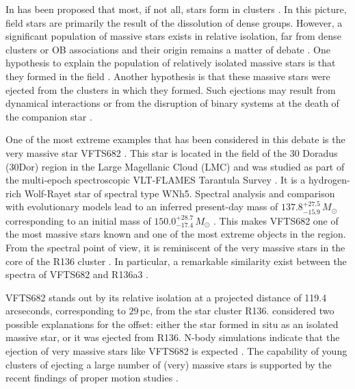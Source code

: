 \documentclass[a4paper,fleqn,usenatbib]{mnras}
\newcommand{\Msun}{{\,\mathrm{M}_\odot}}
\begin{document}
In has been proposed that most, if not all, stars form in clusters
\citep[and references therein]{lada:03}. In this picture, field stars are primarily the result
of the dissolution of dense groups.  However, a significant population
of massive stars exists in relative isolation, far from dense clusters
or OB associations and their origin remains a matter of debate
\citep{gvaramadze:12, lamb:16,ward:18}. One hypothesis to explain
the population of relatively isolated massive stars is that they
formed in the field \citep[e.g.,][]{parker:07}. Another
hypothesis is that these massive stars were ejected from the clusters
in which they formed. Such ejections may result from dynamical interactions \citep[e.g.,][]{poveda:67} or from the disruption of binary systems at the death of the companion  star \citep[e.g.,][]{blaauw:61, renzo:18}. 
 

One of the most extreme examples that has been considered in this
debate is the very massive star VFTS682  \citep[][]{bestenlehner:11,
  bressert:12}. This star is located in the field of the 30 Doradus
(30Dor) region in the Large Magellanic Cloud (LMC) and was studied as part of the multi-epoch spectroscopic VLT-FLAMES Tarantula Survey \citep[VFTS,][]{evans:11}. It is a hydrogen-rich Wolf-Rayet star of spectral type WNh5. Spectral analysis and comparison with evolutionary models lead to an inferred present-day mass of $137.8^{+27.5}_{-15.9}\,M_\odot$ corresponding to an initial mass of $150.0^{+28.7}_{-17.4}\,M_\odot$
\citep{schneider:18}. 
This makes VFTS682 one of the most massive stars known and one of the most extreme objects in the region.
From the spectral point of view, it is reminiscent of the very
massive stars in the core of the R136 cluster \citep{dekoter:97,crowther:10, crowther:16}. 
In particular, a remarkable similarity exist between the
spectra of VFTS682 and R136a3 \citep{rubio-diez:17}.%

VFTS682 stands out by its relative isolation at a projected distance of 119.4 arcseconds, corresponding to 
$29$\,pc, from  the star cluster R136. \citet{bestenlehner:11}
considered two possible explanations for the offset: either
the star formed in situ as an isolated massive star, or it was ejected from  R136. N-body simulations 
indicate that the ejection of very massive stars like VFTS682 is
expected \citep[e.g.][]{fujii:11, banerjee:12}. The capability of
young clusters of ejecting a large number of (very) massive stars is supported by
the recent findings of proper motion studies \citep[e.g.,][]{lennon:18, drew:18}.
\end{document}
